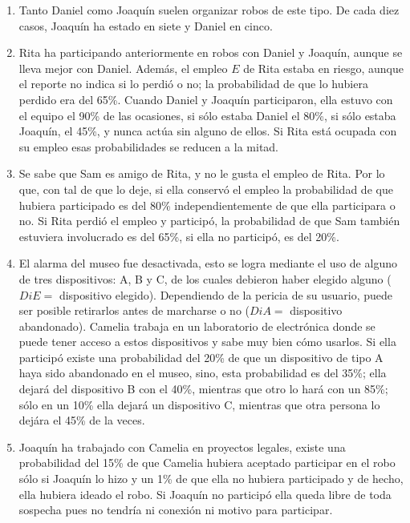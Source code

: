 \begin{enumerate}

 \item Tanto Daniel como Joaquín suelen organizar robos de este tipo.  De cada diez casos, Joaquín ha estado en siete y Daniel en cinco.

 \item Rita ha participando anteriormente en robos con Daniel y Joaquín, aunque se lleva mejor con Daniel.  Además, el empleo $E$ de Rita estaba en riesgo, aunque el reporte no indica si lo perdió o no; la probabilidad de que lo hubiera perdido era del 65\%.  Cuando Daniel y Joaquín participaron, ella estuvo con el equipo el 90\% de las ocasiones, si sólo estaba Daniel el 80\%, si sólo estaba Joaquín, el 45\%, y nunca actúa sin alguno de ellos.  Si Rita está ocupada con su empleo esas probabilidades se reducen a la mitad.

 \item Se sabe que Sam es amigo de Rita, y no le gusta el empleo de Rita.  Por lo que, con tal de que lo deje, si ella conservó el empleo la probabilidad de que hubiera participado es del 80\% independientemente de que ella participara o no.  Si Rita perdió el empleo y participó, la probabilidad de que Sam también estuviera involucrado es del 65\%, si ella no participó, es del 20\%.

 \item  El alarma del museo fue desactivada, esto se logra mediante el uso de alguno de tres dispositivos: A, B y C, de los cuales debieron haber elegido alguno ($DiE = $ dispositivo elegido).  Dependiendo de la pericia de su usuario, puede ser posible retirarlos antes de marcharse o no ($DiA = $ dispositivo abandonado).   Camelia trabaja en un laboratorio de electrónica donde se puede tener acceso a estos dispositivos y sabe muy bien cómo usarlos.  Si ella participó existe una probabilidad del 20\% de que un dispositivo de tipo A haya sido abandonado en el museo, sino, esta probabilidad es del 35\%; ella dejará del dispositivo B con el  40\%, mientras que otro lo hará con un  85\%; sólo en un 10\% ella dejará un dispositivo C, mientras que otra persona lo dejára el 45\% de la veces.

 \item Joaquín ha trabajado con Camelia en proyectos legales, existe una probabilidad del 15\% de que Camelia hubiera aceptado participar en el robo sólo si Joaquín lo hizo y un 1\% de que ella no hubiera participado y de hecho, ella hubiera ideado el robo.  Si Joaquín no participó ella queda libre de toda sospecha pues no tendría ni conexión ni motivo para participar.


\end{enumerate}
